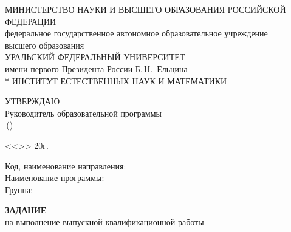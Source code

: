 \documentclass[a4paper,12pt]{article}
\newcommand{\uline}[1]{\underline{\hspace{#1}}} %
\begin{document}
\newpage
\thispagestyle{empty}
	\smallskip
	\begin{center}
		МИНИСТЕРСТВО НАУКИ И ВЫСШЕГО ОБРАЗОВАНИЯ РОССИЙСКОЙ\\
		ФЕДЕРАЦИИ\\
		федеральное государственное автономное образовательное учреждение\\
		высшего образования\\
		УРАЛЬСКИЙ ФЕДЕРАЛЬНЫЙ УНИВЕРСИТЕТ\\
		имени первого Президента России Б.\,Н.~Ельцина\\*
		\bigskip
		ИНСТИТУТ ЕСТЕСТВЕННЫХ НАУК И МАТЕМАТИКИ\\
	\end{center}
	\vspace{1cm}
	\hfill
	\begin{minipage}{0.5\textwidth}
	\begin{center}
	УТВЕРЖДАЮ\\
	\bigskip
	Руководитель образовательной программы\\
	\bigskip
	\uline{4.5cm}\,(\uline{3.3cm})
	\end{center}
	\begin{flushright}
	<<\uline{1cm}>>\,\uline{3.7cm}\,20\uline{0.6cm}г.
	\end{flushright}
	\end{minipage}
	\begin{flushleft}
	\vspace{1.2cm}
	Код, наименование направления: \uline{0.611\textwidth}\\
	Наименование программы: \uline{0.682\textwidth}\\
	Группа: \uline{0.35\textwidth}
	\end{flushleft}
	\bigskip
	\begin{center}
	{\bf ЗАДАНИЕ}\\
	на выполнение выпускной квалификационной работы
	\end{center}
\end{document}
